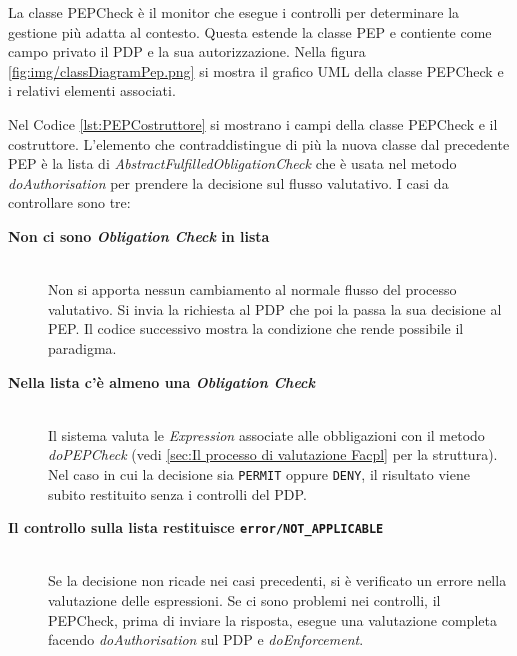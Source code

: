 La classe PEPCheck è il monitor che esegue i controlli per determinare la gestione più adatta al contesto.
Questa estende la classe \ac{PEP} e contiente come campo privato il \ac{PDP} e la sua autorizzazione.
Nella figura \ref{fig:img/classDiagramPep.png} si mostra il grafico \ac{UML} della classe PEPCheck e i relativi elementi
associati.\par
{}
Nel Codice \ref{lst:PEPCostruttore} si mostrano i campi della classe PEPCheck e il costruttore.
L'elemento che contraddistingue di più la nuova classe dal precedente \ac{PEP} è la lista di
\emph{AbstractFulfilledObligationCheck} che è usata nel metodo \emph{doAuthorisation}
per prendere la decisione sul flusso valutativo. I casi da controllare sono tre:
\begin{description}

  \item[\normalfont\bfseries{\MakeUppercase{N}on ci sono \emph{Obligation Check} in lista}]
  {
  \hfill \\
  Non si apporta nessun cambiamento al normale flusso del processo valutativo.
  Si invia la richiesta al \ac{PDP} che poi la passa la sua decisione al PEP.
  Il codice successivo mostra la condizione che rende possibile il paradigma.
  }

  \item[\normalfont\bfseries{\MakeUppercase{N}ella lista c'è almeno una \emph{Obligation Check}}]
  {
  \hfill \\
  Il sistema valuta le \emph{Expression} associate alle obbligazioni con il metodo
  \emph{doPEPCheck} (vedi \ref{sec:Il processo di valutazione Facpl}
  per la struttura). Nel caso in cui la decisione sia \texttt{PERMIT} oppure \texttt{DENY},
  il risultato viene subito restituito senza i controlli del \ac{PDP}.
  }

  \item[\normalfont\bfseries{\MakeUppercase{I}l controllo sulla lista restituisce \texttt{error/\MakeUppercase{NOT\_APPLICABLE}}}]
  {
  \hfill \\
  Se la decisione non ricade nei casi precedenti,
  si è verificato un errore nella valutazione delle espressioni. Se ci sono problemi nei controlli, il PEPCheck, prima di
  inviare la risposta, esegue una valutazione completa facendo \emph{doAuthorisation} sul \ac{PDP} e \emph{doEnforcement}.
  }

\end{description}


